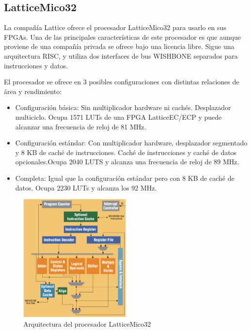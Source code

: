 	\subsection{LatticeMico32}
 
La compañía Lattice ofrece el procesador LatticeMico32 para usarlo en sus FPGAs. Una de las principales características de este procesador es que aunque proviene de una compañía privada se ofrece bajo una licencia libre. Sigue una arquitectura RISC, y utiliza dos interfaces de bus WISHBONE \cite{Etiqueta34}separados para instrucciones y datos.

 El procesador se ofrece en 3 posibles configuraciones con distintas relaciones de área y rendimiento:

\begin{itemize}
		  \item Configuración básica: Sin multiplicador hardware ni cachés. Desplazador multiciclo. Ocupa 1571 LUTs de una FPGA LatticeEC/ECP y puede alcanzar una frecuencia de reloj de 81 MHz.
		 \item Configuración estándar: Con multiplicador hardware, desplazador segmentado y 8 KB de caché de instrucciones. Caché de instrucciones y caché de datos opcionales.Ocupa 2040 LUTS y alcanza una frecuencia de reloj de 89 MHz.
 		\item Completa: Igual que la configuración estándar pero con 8 KB de caché de datos. Ocupa 2230 LUTs y alcanza los 92 MHz.
		\end{itemize}

\begin{figure}[h!]
 	\begin{center}
  	\includegraphics[width=0.5\textwidth,keepaspectratio=true]{./images/latice}
  	\caption{Arquitectura del procesador LatticeMico32}
 	\end{center}
	\end{figure}

